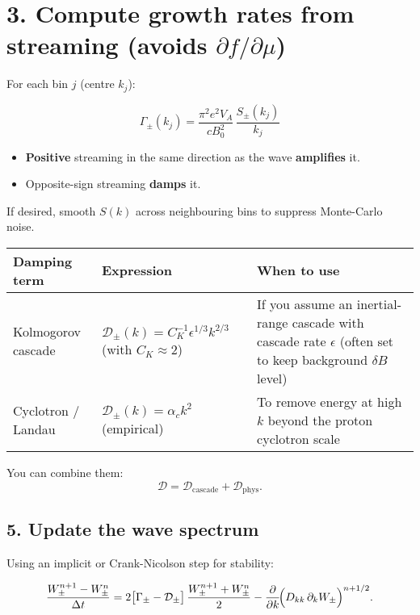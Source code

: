 \section*{3. Compute \textbf{growth rates} from streaming (avoids \( \partial f / \partial \mu \))}

For each bin \( j \) (centre \( k_j \)):

\[
\boxed{
\Gamma_{\pm}(k_j) = \frac{\pi^{2} e^{2} V_A}{c B_0^{2}} \, \frac{S_{\pm}(k_j)}{k_j}
}
\tag{1}
\]

\begin{itemize}
    \item \textbf{Positive} streaming in the same direction as the wave \textbf{amplifies} it.
    \item Opposite-sign streaming \textbf{damps} it.
\end{itemize}

If desired, smooth \( S(k) \) across neighbouring bins to suppress Monte-Carlo noise.



\begin{tabular}{@{}lll@{}}
\toprule
\textbf{Damping term} & \textbf{Expression} & \textbf{When to use} \\
\midrule
Kolmogorov cascade & 
\(
\mathcal{D}_{\pm}(k) = C_K^{-1} \epsilon^{1/3} k^{2/3}
\) (with \( C_K \approx 2 \)) &
If you assume an inertial-range cascade with cascade rate \( \epsilon \) (often set to keep background \( \delta B \) level) \\
\addlinespace
Cyclotron / Landau &
\(
\mathcal{D}_{\pm}(k) = \alpha_c k^2
\) (empirical) &
To remove energy at high \( k \) beyond the proton cyclotron scale \\
\bottomrule
\end{tabular}

\vspace{1em}

You can combine them:
\[
\mathcal{D} = \mathcal{D}_{\text{cascade}} + \mathcal{D}_{\text{phys}}.
\]

\subsection{ 5.  Update the wave spectrum}

Using an implicit or Crank-Nicolson step for stability:

$$
\frac{W_\pm^{n+1}-W_\pm^{n}}{\Delta t}
= 2\bigl[\Gamma_\pm-\mathcal{D}_\pm\bigr]\,\frac{W_\pm^{n+1}+W_\pm^{n}}{2}
-\frac{\partial}{\partial k}\!\Bigl(D_{kk}\,\partial_k W_\pm \Bigr)^{n+1/2}.
$$

